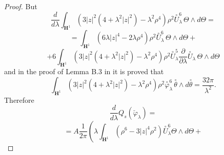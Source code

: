 \documentclass[10pt,a4paper]{amsart}
\renewcommand{\phi}{\varphi}
\newcommand{\de}{\partial}
\renewcommand{\H}{\mathbf{H}}
\renewcommand{\l}{\lambda }
\newcommand{\var}{\varphi }
\begin{document}
\begin{proof}
 But
 $$ \frac{d}{d\lambda}\int_{\H^1} \left( 3 |z|^2 (4 + \l^2 |z|^2) - \l^2 \rho^4 \right) \rho^2 \overset{\circ}{U}_\l^6 \, \Theta\wedge d\Theta = $$
 $$=\int_{\H^1} \left( 6\l |z|^4 - 2\l \rho^4 \right) \rho^2 \overset{\circ}{U}_\l^6 \, \Theta\wedge d\Theta + $$
 $$ +6\int_{\H^1} \left( 3 |z|^2 (4 + \l^2 |z|^2) - \l^2 \rho^4 \right) \rho^2 \overset{\circ}{U}_\l^5\frac{\de}{\de\lambda}\overset{\circ}{U}_{\lambda} \, \Theta\wedge d\Theta $$
 and in the proof of Lemma B.3 in \cite{CMY2} it is proved that
 $$\int_{\H^1} \left( 3 |z|^2 (4 + \l^2 |z|^2) - \l^2 \rho^4 \right) \rho^2 \overset{\circ}{\var}_\l^6 \, \overset{\circ}{\theta} \wedge d \overset{\circ}{\theta} = \frac{32\pi}{\lambda^2}.$$
 Therefore
 $$\frac{d}{d\lambda}Q_s(\breve{\var}_\l) = $$
 $$= A\frac{1}{2\pi}\left( \l \int_{\H^1} \left(\rho^6 -3|z|^4 \rho^2\right)\overset{\circ}{U}_\l^6 \Theta\wedge d\Theta + \right.$$

\end{proof}
\end{document}
